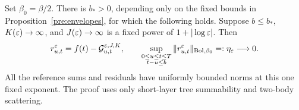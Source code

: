 \begin{proposition}\label{cent:residual}
Set $\beta_0=\beta/2$. There is $b_*>0$, depending only on the fixed
bounds in Proposition~\ref{pre:envelopes}, for which the following
holds. Suppose $b\leq b_*$, $K(\varepsilon)\to\infty$, and
$J(\varepsilon)\to\infty$ is a fixed power of $1+|\log\varepsilon|$.
Then
\begin{equation}\label{cent:residual-def}
 r_{u,t}^{\varepsilon}=f(t)-\mathcal G_{u,t}^{\varepsilon,J,K},\qquad
 \sup_{\substack{0\leq u\leq t\leq T\\t-u\leq b}}
 \|r_{u,t}^{\varepsilon}\|_{\mathrm{Bol},\beta_0}
 =:\eta_\varepsilon\longrightarrow0.
\end{equation}
All the reference sums and residuals have uniformly bounded norms at
this one fixed exponent. The proof uses only short-layer tree
summability and two-body scattering.
\end{proposition}
